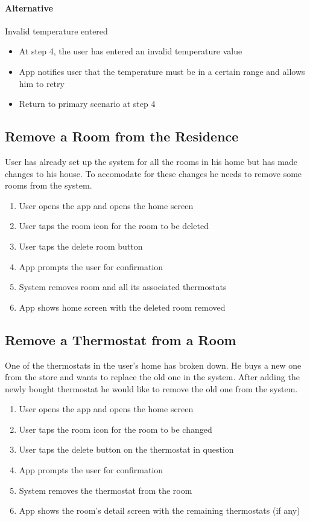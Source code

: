\paragraph{Alternative} Invalid temperature entered
\begin{itemize}
    \item At step 4, the user has entered an invalid temperature value
    \item App notifies user that the temperature must be in a certain range and allows him to retry
    \item Return to primary scenario at step 4
\end{itemize}

\subsection{Remove a Room from the Residence}
User has already set up the system for all the rooms in his home but has made changes to his house. To accomodate for these changes he needs to remove some rooms from the system.
\begin{enumerate}
    \item User opens the app and opens the home screen
    \item User taps the room icon for the room to be deleted
    \item User taps the delete room button
    \item App prompts the user for confirmation
    \item System removes room and all its associated thermostats
    \item App shows home screen with the deleted room removed
\end{enumerate}

\subsection{Remove a Thermostat from a Room}
One of the thermostats in the user's home has broken down. He buys a new one from the store and wants to replace the old one in the system. After adding the newly bought thermostat he would like to remove the old one from the system.
\begin{enumerate}
    \item User opens the app and opens the home screen
    \item User taps the room icon for the room to be changed
    \item User taps the delete button on the thermostat in question
    \item App prompts the user for confirmation
    \item System removes the thermostat from the room
    \item App shows the room's detail screen with the remaining thermostats (if any)
\end{enumerate}

